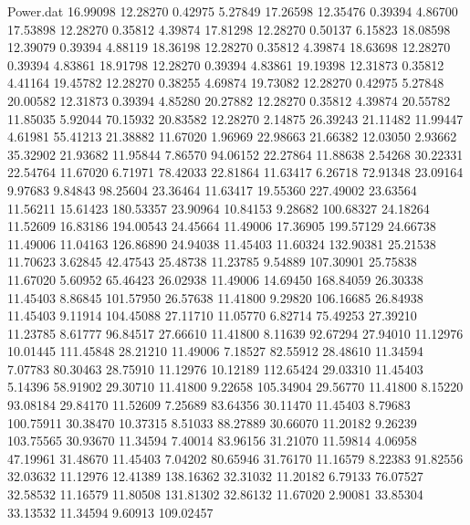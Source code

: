 \begin{filecontents}{Power.dat}
  16.99098   12.28270    0.42975    5.27849
  17.26598   12.35476    0.39394    4.86700
  17.53898   12.28270    0.35812    4.39874
  17.81298   12.28270    0.50137    6.15823
  18.08598   12.39079    0.39394    4.88119
  18.36198   12.28270    0.35812    4.39874
  18.63698   12.28270    0.39394    4.83861
  18.91798   12.28270    0.39394    4.83861
  19.19398   12.31873    0.35812    4.41164
  19.45782   12.28270    0.38255    4.69874
  19.73082   12.28270    0.42975    5.27848
  20.00582   12.31873    0.39394    4.85280
  20.27882   12.28270    0.35812    4.39874
  20.55782   11.85035    5.92044   70.15932
  20.83582   12.28270    2.14875   26.39243
  21.11482   11.99447    4.61981   55.41213
  21.38882   11.67020    1.96969   22.98663
  21.66382   12.03050    2.93662   35.32902
  21.93682   11.95844    7.86570   94.06152
  22.27864   11.88638    2.54268   30.22331
  22.54764   11.67020    6.71971   78.42033
  22.81864   11.63417    6.26718   72.91348
  23.09164    9.97683    9.84843   98.25604
  23.36464   11.63417   19.55360  227.49002
  23.63564   11.56211   15.61423  180.53357
  23.90964   10.84153    9.28682  100.68327
  24.18264   11.52609   16.83186  194.00543
  24.45664   11.49006   17.36905  199.57129
  24.66738   11.49006   11.04163  126.86890
  24.94038   11.45403   11.60324  132.90381
  25.21538   11.70623    3.62845   42.47543
  25.48738   11.23785    9.54889  107.30901
  25.75838   11.67020    5.60952   65.46423
  26.02938   11.49006   14.69450  168.84059
  26.30338   11.45403    8.86845  101.57950
  26.57638   11.41800    9.29820  106.16685
  26.84938   11.45403    9.11914  104.45088
  27.11710   11.05770    6.82714   75.49253
  27.39210   11.23785    8.61777   96.84517
  27.66610   11.41800    8.11639   92.67294
  27.94010   11.12976   10.01445  111.45848
  28.21210   11.49006    7.18527   82.55912
  28.48610   11.34594    7.07783   80.30463
  28.75910   11.12976   10.12189  112.65424
  29.03310   11.45403    5.14396   58.91902
  29.30710   11.41800    9.22658  105.34904
  29.56770   11.41800    8.15220   93.08184
  29.84170   11.52609    7.25689   83.64356
  30.11470   11.45403    8.79683  100.75911
  30.38470   10.37315    8.51033   88.27889
  30.66070   11.20182    9.26239  103.75565
  30.93670   11.34594    7.40014   83.96156
  31.21070   11.59814    4.06958   47.19961
  31.48670   11.45403    7.04202   80.65946
  31.76170   11.16579    8.22383   91.82556
  32.03632   11.12976   12.41389  138.16362
  32.31032   11.20182    6.79133   76.07527
  32.58532   11.16579   11.80508  131.81302
  32.86132   11.67020    2.90081   33.85304
  33.13532   11.34594    9.60913  109.02457

\end{filecontents}
